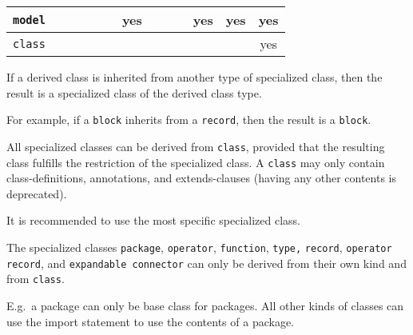 \begin{center}
{\begin{tabular}{|c||c|c|c|c|c|c|c|c|c|c|c|c|}
    \hline
    \lstinline!model!             &                          &                           &                                            &                      &                          & \cellcolor{lightgray}yes &                          &                          &                            & \cellcolor{lightgray}yes & yes                    & \cellcolor{lightgray}yes                   \\
    \hline
    \lstinline!class!             &                          &                           &                                            &                      &                          &                          &                          &                          &                            &                          &                        & yes                                        \\
    \hline
\end{tabular}
\ifpdf}\else\fi%
\end{center}

If a derived class is inherited from another type of specialized class,
then the result is a specialized class of the derived class type.

\begin{nonnormative}
For example, if a \lstinline!block! inherits from a \lstinline!record!, then the result is a \lstinline!block!.
\end{nonnormative}

All specialized classes can be derived from \lstinline!class!, provided that the
resulting class fulfills the restriction of the specialized class.  A \lstinline!class! may
only contain class-definitions, annotations, and extends-clauses (having
any other contents is deprecated).

\begin{nonnormative}
It is recommended to use the most specific specialized class.
\end{nonnormative}

The specialized classes \lstinline!package!, \lstinline!operator!, \lstinline!function!,
\lstinline!type,! \lstinline!record!,
\lstinline!operator record!, and \lstinline!expandable connector! can only be derived from their
own kind and from \lstinline!class!.

\begin{nonnormative}
E.g.\ a package can only be base class for packages.  All other kinds of classes can use the import statement to use the contents of a package.
\end{nonnormative}

